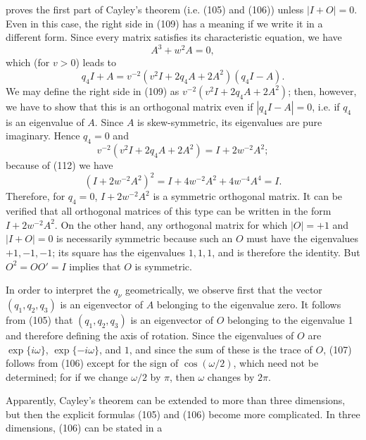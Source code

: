 proves the first part of Cayley's theorem (i.e. (105) and (106)) unless $|I+O|=0$. Even in this case, the right side in (109) has a meaning if we write it in a different form. Since every matrix satisfies its characteristic equation, we have
\begin{equation}\tag{112}
A^3+w^2A=0,
\end{equation}
which (for $v>0$) leads to
\begin{equation}\tag{113}
q_4I+A=v^{-2}(v^2I+2q_4A+2A^2)(q_4I-A).
\end{equation}
We may define the right side in (109) as $v^{-2}(v^2I+2q_4A+2A^2)$; then, however, we have to show that this is an orthogonal matrix even if $|q_4I-A|=0$, i.e. if $q_4$ is an eigenvalue of $A$. Since $A$ is skew-symmetric, its eigenvalues are pure imaginary. Hence $q_4=0$ and
\begin{equation}\tag{114}
v^{-2}(v^2I+2q_4A+2A^2)=I+2w^{-2}A^2;
\end{equation}
because of (112) we have
\begin{equation}\tag{115}
(I+2w^{-2}A^2)^2=I+4w^{-2}A^2+4w^{-4}A^4=I.
\end{equation}
Therefore, for $q_4=0$, $I+2w^{-2}A^2$ is a symmetric orthogonal matrix. It can be verified that all orthogonal matrices of this type can be written in the form $I+2w^{-2}A^2$. On the other hand, any orthogonal matrix for which $|O|=+1$ and $|I+O|=0$ is necessarily symmetric because such an $O$ must have the eigenvalues $+1,-1,-1$; its square has the eigenvalues $1,1,1$, and is therefore the identity. But $O^2=OO'=I$ implies that $O$ is symmetric.

In order to interpret the $q_\nu$ geometrically, we observe first that the vector $(q_1,q_2,q_3)$ is an eigenvector of $A$ belonging to the eigenvalue zero. It follows from (105) that $(q_1,q_2,q_3)$ is an eigenvector of $O$ belonging to the eigenvalue 1 and therefore defining the axis of rotation. Since the eigenvalues of $O$ are $\exp\{i\omega\}$, $\exp\{-i\omega\}$, and $1$, and since the sum of these is the trace of $O$, (107) follows from (106) except for the sign of $\cos(\omega/2)$, which need not be determined; for if we change $\omega/2$ by $\pi$, then $\omega$ changes by $2\pi$.

Apparently, Cayley's theorem can be extended to more than three dimensions, but then the explicit formulas (105) and (106) become more complicated. In three dimensions, (106) can be stated in a

